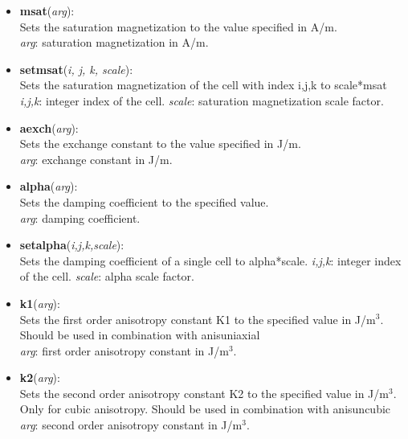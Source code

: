\begin{itemize}
 \item \textbf{msat}(\textit{arg}):\\
				Sets the saturation magnetization to the value specified in A/m.\\
				\textit{arg}: saturation magnetization in A/m.
 
 \item \textbf{setmsat}(\textit{i, j, k, scale}):\\
				Sets the saturation magnetization of the cell with index i,j,k to scale*msat\\
				\textit{i,j,k}: integer index of the cell. \textit{scale}: saturation magnetization scale factor.

 \item \textbf{aexch}(\textit{arg}):\\
				Sets the exchange constant to the value specified in J/m.\\
				\textit{arg}: exchange constant in J/m.

 \item \textbf{alpha}(\textit{arg}):\\
				Sets the damping coefficient to the specified value.\\
				\textit{arg}: damping coefficient.

 \item \textbf{setalpha}(\textit{i,j,k,scale}):\\
				Sets the damping coefficient of a single cell to alpha*scale.
				\textit{i,j,k}: integer index of the cell. \textit{scale}: alpha scale factor.

 \item \textbf{k1}(\textit{arg}):\\
				Sets the first order anisotropy constant K1 to the specified value in J/m$^3$.  Should be used in combination with anisuniaxial\\
				\textit{arg}: first order anisotropy constant in J/m$^3$.

 \item \textbf{k2}(\textit{arg}):\\
				Sets the second order anisotropy constant K2 to the specified value in J/m$^3$.  Only for cubic anisotropy.  Should be used in combination with \textrm{anisuncubic}\\
				\textit{arg}: second order anisotropy constant in J/m$^3$.


\end{itemize}
